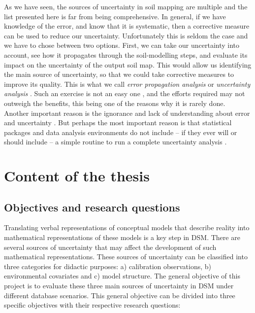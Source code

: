 As we have seen, the sources of uncertainty in soil mapping are multiple and the list presented here
is far from being comprehensive. In general, if we have knowledge of the error, and know that it is
systematic, then a corrective measure can be used to reduce our uncertainty. Unfortunately this is 
seldom the case and we have to chose between two options. First, we can take our uncertainty into 
account, see how it propagates through the soil-modelling steps, and evaluate its impact on the 
uncertainty of the output soil map. This would allow us identifying the main source of uncertainty,
so that we could take corrective measures to improve its quality. This is what we call 
\textit{error propagation analysis} or \textit{uncertainty analysis} \citep{HeuvelinkEtAl1989, 
Taylor1997}. Such an exercise is not an easy one \citep{NelsonEtAl2011}, and the efforts required 
may not outweigh the benefits, this being one of the reasons why it is rarely done. Another important 
reason is the ignorance and lack of understanding about error and uncertainty \citep{Wechsler2003, 
Heuvelink2005}. But perhaps the most important reason is that statistical packages and data 
analysis environments do not include -- if they ever will or should include -- a simple routine to 
run a complete uncertainty analysis \citep{HeuvelinkEtAl2006b}.







\section{Content of the thesis}

\subsection{Objectives and research questions}



Translating verbal representations of conceptual models that describe reality 
into mathematical representations of these models is a key step in DSM. There 
are several sources of uncertainty that may affect the development of such 
mathematical representations. These sources of uncertainty can be classified 
into three categories for didactic purposes: a) calibration observations, b) 
environmental covariates and c) model structure. The general objective of this 
project is to evaluate these three main sources of uncertainty in DSM under 
different database scenarios. This general objective can be divided into three 
specific objectives with their respective research questions:

